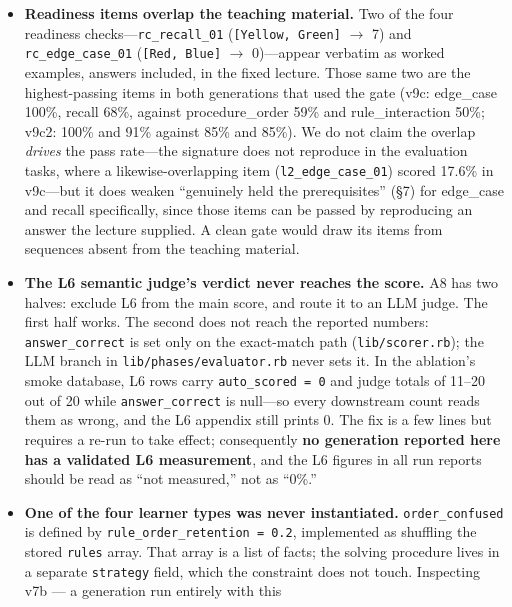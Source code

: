 \documentclass[11pt]{article}
\begin{document}
\begin{itemize}
    descriptive statistics and interpretation flags, not $p$-values, and recommend
    \texttt{n\_disc = 10--15} for a confirmatory run.
  \item \textbf{Readiness items overlap the teaching material.}  Two of the four
    readiness checks---\texttt{rc\_recall\_01} (\texttt{[Yellow, Green]} $\to$ 7) and
    \texttt{rc\_edge\_case\_01} (\texttt{[Red, Blue]} $\to$ 0)---appear verbatim as
    worked examples, answers included, in the fixed lecture.  Those same two are the
    highest-passing items in both generations that used the gate (v9c: edge\_case
    100\%, recall 68\%, against procedure\_order 59\% and rule\_interaction 50\%;
    v9c2: 100\% and 91\% against 85\% and 85\%).  We do not claim the overlap
    \emph{drives} the pass rate---the signature does not reproduce in the evaluation
    tasks, where a likewise-overlapping item (\texttt{l2\_edge\_case\_01}) scored
    17.6\% in v9c---but it does weaken ``genuinely held the prerequisites'' (\S7)
    for edge\_case and recall specifically, since those items can be passed by
    reproducing an answer the lecture supplied.  A clean gate would draw its items
    from sequences absent from the teaching material.
  \item \textbf{The L6 semantic judge's verdict never reaches the score.}  A8 has two
    halves: exclude L6 from the main score, and route it to an LLM judge.  The first
    half works.  The second does not reach the reported numbers:
    \texttt{answer\_correct} is set only on the exact-match path
    (\texttt{lib/scorer.rb}); the LLM branch in \texttt{lib/phases/evaluator.rb}
    never sets it.  In the ablation's smoke database, L6 rows carry
    \texttt{auto\_scored = 0} and judge totals of 11--20 out of 20 while
    \texttt{answer\_correct} is null---so every downstream count reads them as wrong,
    and the L6 appendix still prints 0.  The fix is a few lines but requires a re-run
    to take effect; consequently \textbf{no generation reported here has a validated
    L6 measurement}, and the L6 figures in all run reports should be read as ``not
    measured,'' not as ``0\%.''
  \item \textbf{One of the four learner types was never instantiated.}
    \texttt{order\_confused} is defined by \texttt{rule\_order\_retention = 0.2},
    implemented as shuffling the stored \texttt{rules} array.  That array is a list of
    facts; the solving procedure lives in a separate \texttt{strategy} field, which the
    constraint does not touch.  Inspecting v7b --- a generation run entirely with this

\end{itemize}
\end{document}

